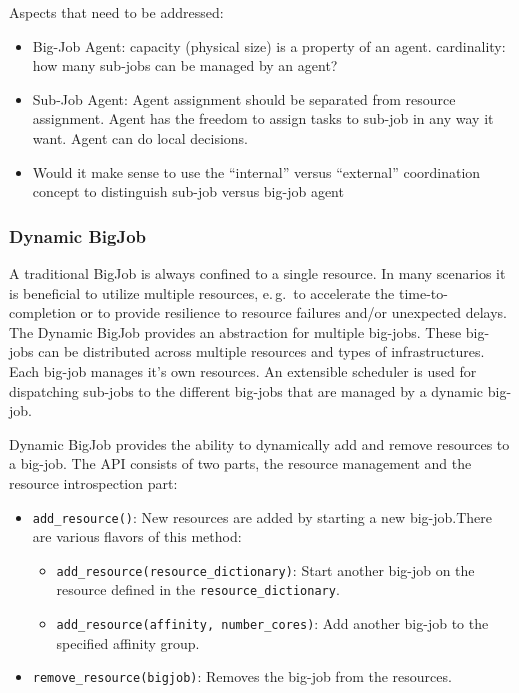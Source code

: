 \documentclass[conference,final]{IEEEtran}
\begin{document}
Aspects that need to be addressed:
\begin{itemize}
    \item Big-Job Agent: capacity (physical size) is a property of an agent. 
	cardinality: how many sub-jobs can be managed by an agent?
	\item Sub-Job Agent: Agent assignment should be separated from resource 
	assignment. Agent has the freedom to assign tasks to sub-job in any way 
	it want. Agent can do local decisions.    
  \item Would it make sense to use the ``internal'' versus
    ``external'' coordination concept to distinguish sub-job
    versus big-job agent
\end{itemize}

\subsubsection{Dynamic BigJob}

\label{sec:dynamic_bigjob}
A traditional BigJob is always confined to a single resource. In many scenarios 
it is beneficial to utilize multiple resources, e.\,g.\ to accelerate the
time-to-completion or to provide resilience to resource failures and/or
unexpected delays. The Dynamic BigJob provides an abstraction for multiple
big-jobs. These big-jobs can be distributed across multiple resources and types
of infrastructures. Each big-job manages it's own resources. An extensible
scheduler is used for dispatching sub-jobs to the different big-jobs that are
managed by a dynamic big-job.


Dynamic BigJob provides the ability to dynamically add and remove resources to a 
big-job. The API consists of two parts, the resource management and the resource 
introspection part:
\begin{itemize}
    \item \texttt{add\_resource()}: New resources are added by starting a new
    big-job.There are various flavors of this method:
    \begin{itemize}
        \item \texttt{add\_resource(re\-sour\-ce\_dic\-tionary)}: Start another big-job on the resource defined in the \texttt{resource\_dictionary}.
        \item \texttt{add\_resource(affinity, number\_cores)}: Add another big-job to the specified affinity group.
    \end{itemize}
    \item \texttt{remove\_resource(bigjob)}: Removes the big-job from the
    resources.
\end{itemize}
\end{document}
